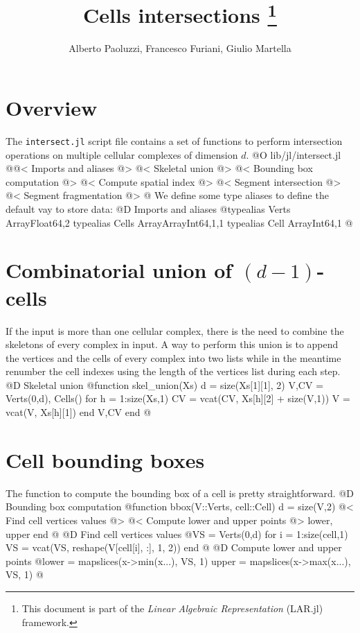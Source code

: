 \documentclass[10pt,oneside]{article}
\author{Alberto Paoluzzi, Francesco Furiani, Giulio Martella}
\title{Cells intersections
\footnote{This document is part of the \emph{Linear Algebraic Representation} (LAR.jl) framework.}
}
\begin{document}
\maketitle
\newpage

\section{Overview}
The \texttt{intersect.jl} script file contains a set of functions to perform intersection
operations on multiple cellular complexes of dimension $d$.
@O lib/jl/intersect.jl
@{@< Imports and aliases @>
@< Skeletal union @>
@< Bounding box computation @>
@< Compute spatial index @>
@< Segment intersection @>
@< Segment fragmentation @>
@}
We define some type aliases to define the default vay to store data:
@D Imports and aliases
@{typealias Verts Array{Float64,2}
typealias Cells Array{Array{Int64,1},1}
typealias Cell Array{Int64,1}
@}

\section{Combinatorial union of $(d-1)$-cells}
If the input is more than one cellular complex, there is the need to combine 
the skeletons of every complex in input. A way to perform this union is to append
the vertices and the cells of every complex into two lists while in the meantime 
renumber the cell indexes using the length of the vertices list during each step.
@D Skeletal union
@{function skel_union(Xs)
    d = size(Xs[1][1], 2)
    V,CV = Verts(0,d), Cells()
    for h = 1:size(Xs,1)
        CV = vcat(CV, Xs[h][2] + size(V,1))
        V = vcat(V, Xs[h][1])
    end
    V,CV
end
@}

\section{Cell bounding boxes}
The function to compute the bounding box of a cell
is pretty straightforward.
@D Bounding box computation
@{function bbox(V::Verts, cell::Cell)
    d = size(V,2)
    @< Find cell vertices values @>
    @< Compute lower and upper points @>
    lower, upper
end
@}
@D Find cell vertices values
@{VS = Verts(0,d)
for i = 1:size(cell,1)
    VS = vcat(VS, reshape(V[cell[i], :], 1, 2))
end
@}
@D Compute lower and upper points
@{lower = mapslices(x->min(x...), VS, 1)
upper = mapslices(x->max(x...), VS, 1)
@}
\end{document}
